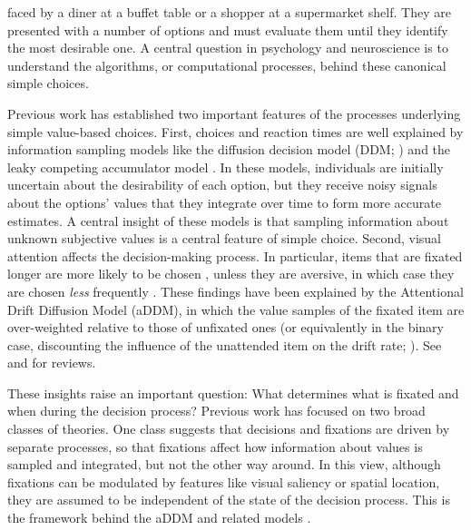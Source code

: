  faced by a diner at a buffet table or a shopper at a supermarket shelf. They are presented with a number of options and must evaluate them until they identify the most desirable one. A central question in psychology and neuroscience is to understand the algorithms, or computational processes, behind these canonical simple choices.

Previous work has established two important features of the processes underlying simple value-based choices. First, choices and reaction times are well explained by information sampling models like the diffusion decision model (DDM; \citealp{ratcliff2008diffusion,ratcliff2016diffusion,milosavljevic2010drift}) and the leaky competing accumulator model \citep{usher2001time,usher2004loss}. In these models, individuals are initially uncertain about the desirability of each option, but they receive noisy signals about the options' values that they integrate over time to form more accurate estimates. A central insight of these models is that sampling information about unknown subjective values is a central feature of simple choice. Second, visual attention affects the decision-making process. In particular, items that are fixated longer are more likely to be chosen \citep{shimojo2003gaze,armel2008biasing,glaholt2009stimulus,krajbich2010visual,krajbich2011multialternative,cavanagh2014eye,tavares2017attentional,smith2019gaze}, unless they are aversive, in which case they are chosen \emph{less} frequently \citep{armel2008neuroeconomic,armel2008biasing}. These findings have been explained by the Attentional Drift Diffusion Model (aDDM), in which the value samples of the fixated item are over-weighted relative to those of unfixated ones (or equivalently in the binary case, discounting the influence of the unattended item on the drift rate; \citealp{krajbich2010visual,krajbich2011multialternative,smith2019gaze,tavares2017attentional}). See \citet{orquin2013attention} and \citet{krajbich2018accounting} for reviews.

These insights raise an important question: What determines what is fixated and when during the decision process? Previous work has focused on two broad classes of theories. One class suggests that decisions and fixations are driven by separate processes, so that fixations affect how information about values is sampled and integrated, but not the other way around. In this view, although fixations can be modulated by features like visual saliency or spatial location, they are assumed to be independent of the state of the decision process. This is the framework behind the aDDM \citep{krajbich2010visual,krajbich2011multialternative,tavares2017attentional} and related models \citep{gluth2018valuebaseda,towal2013simultaneous,thomas2019gaze}.

